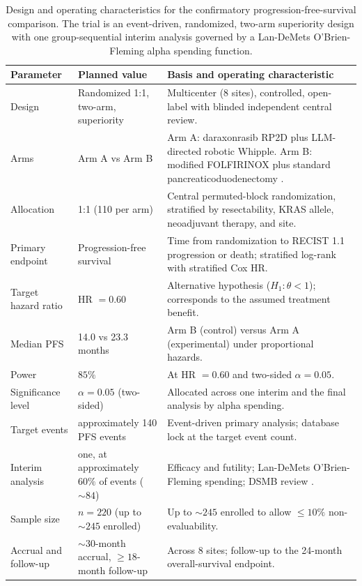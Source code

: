 \begin{table}[htbp]
\centering
\footnotesize
\caption{Design and operating characteristics for the confirmatory
progression-free-survival comparison. The trial is an event-driven, randomized,
two-arm superiority design with one group-sequential interim analysis governed by a
Lan-DeMets O'Brien-Fleming alpha spending function.}
\label{tab:power}
\begin{tabularx}{\textwidth}{L{3cm} L{3.2cm} Y}
\toprule
\textbf{Parameter} & \textbf{Planned value} & \textbf{Basis and operating characteristic} \\
\midrule
Design & Randomized 1:1, two-arm, superiority & Multicenter (8 sites), controlled, open-label with blinded independent central review. \\
Arms & Arm A vs Arm B & Arm A: daraxonrasib RP2D plus LLM-directed robotic Whipple. Arm B: modified FOLFIRINOX plus standard pancreaticoduodenectomy \cite{Conroy2018}. \\
Allocation & 1:1 (110 per arm) & Central permuted-block randomization, stratified by resectability, KRAS allele, neoadjuvant therapy, and site. \\
Primary endpoint & Progression-free survival & Time from randomization to RECIST 1.1 progression or death; stratified log-rank with stratified Cox HR. \\
Target hazard ratio & HR $= 0.60$ & Alternative hypothesis ($H_1\!: \theta < 1$); corresponds to the assumed treatment benefit. \\
Median PFS & 14.0 vs 23.3 months & Arm B (control) versus Arm A (experimental) under proportional hazards. \\
Power & $85\%$ & At HR $= 0.60$ and two-sided $\alpha = 0.05$. \\
Significance level & $\alpha = 0.05$ (two-sided) & Allocated across one interim and the final analysis by alpha spending. \\
Target events & approximately 140 PFS events & Event-driven primary analysis; database lock at the target event count. \\
Interim analysis & one, at approximately $60\%$ of events ($\sim 84$) & Efficacy and futility; Lan-DeMets O'Brien-Fleming spending; DSMB review \cite{DeMets1994lan,Jennison2000group}. \\
Sample size & $n = 220$ (up to $\sim 245$ enrolled) & Up to $\sim 245$ enrolled to allow $\leq 10\%$ non-evaluability. \\
Accrual and follow-up & $\sim 30$-month accrual, $\geq 18$-month follow-up & Across 8 sites; follow-up to the 24-month overall-survival endpoint. \\
\bottomrule
\end{tabularx}
\end{table}

